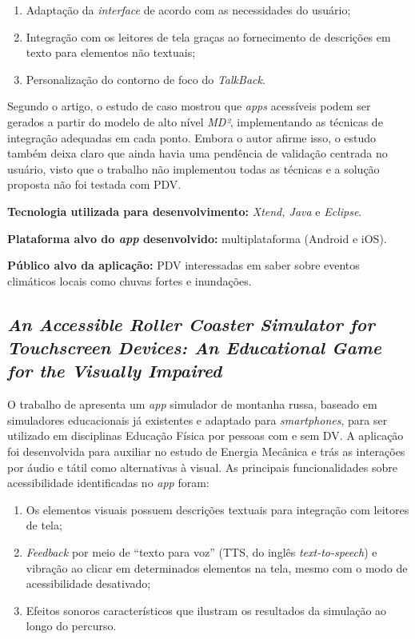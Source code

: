 \begin{enumerate}
    \item Adaptação da \emph{interface} de acordo com as necessidades do usuário;
    \item Integração com os leitores de tela graças ao fornecimento de descrições em texto para elementos não textuais;
    \item Personalização do contorno de foco do \emph{TalkBack}.
\end{enumerate}

Segundo o artigo, o estudo de caso mostrou que \emph{apps} acessíveis podem ser gerados a partir do modelo de alto nível \emph{MD²}, implementando as técnicas de integração adequadas em
cada ponto. Embora o autor afirme isso, o estudo também deixa claro que ainda havia uma pendência de validação centrada no usuário, visto que o trabalho não implementou todas as técnicas
e a solução proposta não foi testada com PDV\@.

\textbf{Tecnologia utilizada para desenvolvimento:} \emph{Xtend, Java} e \emph{Eclipse}.

\textbf{Plataforma alvo do \emph{app} desenvolvido:} multiplataforma (Android e iOS).

\textbf{Público alvo da aplicação:} PDV interessadas em saber sobre eventos climáticos locais como chuvas fortes e inundações.

\subsection{\emph{An Accessible Roller Coaster Simulator for Touchscreen Devices: An Educational Game for the Visually Impaired}}

O trabalho de  apresenta um \emph{app} simulador de montanha russa, baseado em simuladores educacionais já existentes e adaptado para \emph{smartphones}, para ser utilizado em disciplinas Educação Física por pessoas com e sem DV\@.
A aplicação foi desenvolvida para auxiliar no estudo de Energia Mecânica e trás as interações por áudio e tátil como alternativas à visual.
As principais funcionalidades sobre acessibilidade identificadas no \emph{app} foram:

\begin{enumerate}
    \item Os elementos visuais possuem descrições textuais para integração com leitores de tela;
    \item \emph{Feedback} por meio de ``texto para voz'' (TTS, do inglês \emph{text-to-speech}) e vibração ao clicar em determinados elementos na tela, mesmo com o modo de acessibilidade desativado;
    \item Efeitos sonoros característicos que ilustram os resultados da simulação ao longo do percurso.
\end{enumerate}

